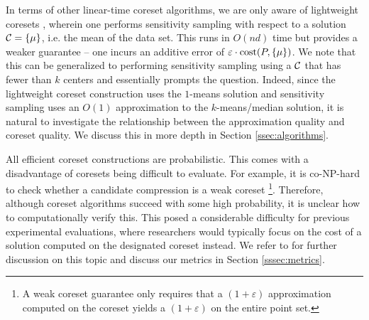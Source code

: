 In terms of other linear-time coreset algorithms, we are only aware of lightweight coresets \cite{BachemL018}, wherein one performs sensitivity sampling with
respect to a solution $\mathcal C=\{\mu\}$, i.e. the mean of the data set. This runs in $O(nd)$ time but provides a weaker guarantee -- one incurs an additive error of $\varepsilon\cdot \operatorname{cost}(P,\{\mu\})$.
We note that this can be generalized to performing sensitivity sampling using a $\mathcal C$ that has fewer than $k$ centers and essentially prompts the question.
Indeed, since the lightweight coreset construction uses the $1$-means solution and sensitivity sampling uses an $O(1)$ approximation to the $k$-means/median
solution, it is natural to investigate the relationship between the approximation quality and coreset quality. We discuss this in more depth in Section
\ref{ssec:algorithms}.

All efficient coreset constructions are probabilistic. This comes with a disadvantage of coresets being difficult to evaluate. For example, it is
co-NP-hard to check whether a candidate compression is a weak coreset \cite{chrisESA} \footnote{A weak coreset guarantee only requires that a $(1+\varepsilon)$
approximation computed on the coreset yields a $(1+\varepsilon)$ on the entire point set.}. Therefore, although coreset algorithms succeed with some high
probability, it is unclear how to computationally verify this.  This posed a considerable difficulty for previous experimental evaluations,
where researchers would typically focus on the cost of a solution computed on the designated coreset instead. We refer to \cite{chrisESA} for further discussion
on this topic and discuss our metrics in Section \ref{sssec:metrics}.

